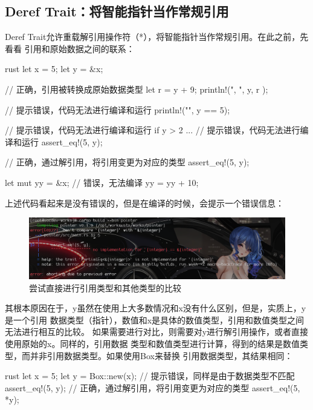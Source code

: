 \subsection{Deref Trait：将智能指针当作常规引用}
Deref Trait允许重载解引用操作符（*），将智能指针当作常规引用。在此之前，先看看
引用和原始数据之间的联系：
\begin{code-block}{rust}
let x = 5;
let y = &x;

// 正确，引用被转换成原始数据类型
let r = y + 9;
println!("{}, {}", y, r );

// 提示错误，代码无法进行编译和运行
println!("{}", y == 5);

// 提示错误，代码无法进行编译和运行
if y > 2 {
    ...
}
// 提示错误，代码无法进行编译和运行
assert_eq!(5, y);

// 正确，通过解引用，将引用变更为对应的类型
assert_eq!(5, y);

let mut yy = &x;
// 错误，无法编译
yy = yy + 10;
\end{code-block}
上述代码看起来是没有错误的，但是在编译的时候，会提示一个错误信息：
\begin{figure}[H]
  \centering
  \includegraphics[width=\linewidth]{rust_pointer_error.png}
  \caption{尝试直接进行引用类型和其他类型的比较}
  \label{fig:rust_pointer_error}
\end{figure}
其根本原因在于，y虽然在使用上大多数情况和x没有什么区别，但是，实质上，y是一个引用
数据类型（指针），数值和x是具体的数值类型，引用和数值类型之间无法进行相互的比较。
如果需要进行对比，则需要对y进行解引用操作，或者直接使用原始的x。同样的，引用数据
类型和数值类型进行计算，得到的结果是数值类型，而并非引用数据类型。如果使用Box来替换
引用数据类型，其结果相同：
\begin{code-block}{rust}
let x = 5;
let y = Box::new(x);
// 提示错误，同样是由于数据类型不匹配
assert_eq!(5, y);
// 正确，通过解引用，将引用变更为对应的类型
assert_eq!(5, *y);
\end{code-block}
